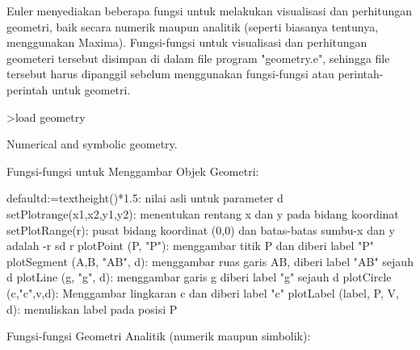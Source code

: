 \documentclass{article}
\begin{document}
\begin{eulernotebook}
\begin{eulercomment}
Euler menyediakan beberapa fungsi untuk melakukan visualisasi dan perhitungan geometri, baik
secara numerik maupun analitik (seperti biasanya tentunya, menggunakan Maxima).
Fungsi-fungsi untuk visualisasi dan perhitungan geometeri tersebut disimpan di dalam file
program "geometry.e", sehingga file tersebut harus dipanggil sebelum menggunakan
fungsi-fungsi atau perintah-perintah untuk geometri.
\end{eulercomment}
\begin{eulerprompt}
>load geometry
\end{eulerprompt}
\begin{euleroutput}
  Numerical and symbolic geometry.
\end{euleroutput}
\begin{eulercomment}
Fungsi-fungsi untuk Menggambar Objek Geometri:

\end{eulercomment}
\begin{eulerttcomment}
  defaultd:=textheight()*1.5: nilai asli untuk parameter d
  setPlotrange(x1,x2,y1,y2): menentukan rentang x dan y pada bidang koordinat
  setPlotRange(r): pusat bidang koordinat (0,0) dan batas-batas sumbu-x dan y adalah -r sd r
  plotPoint (P, "P"): menggambar titik P dan diberi label "P"
  plotSegment (A,B, "AB", d): menggambar ruas garis AB, diberi label "AB" sejauh d
  plotLine (g, "g", d): menggambar garis g diberi label "g" sejauh d
  plotCircle (c,"c",v,d): Menggambar lingkaran c dan diberi label "c"
  plotLabel (label, P, V, d): menuliskan label pada posisi P
\end{eulerttcomment}
\begin{eulercomment}

Fungsi-fungsi Geometri Analitik (numerik maupun simbolik):


\end{eulercomment}
\end{eulernotebook}
\end{document}
